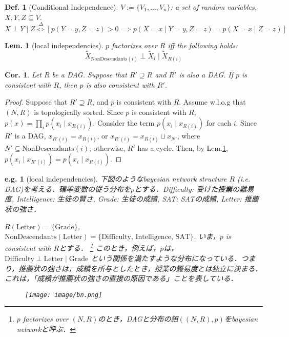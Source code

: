 \documentclass[11pt,a4paper,dvipdfmx]{article}
\theoremstyle{plain}
\newtheorem{lem}{Lem.}[section]
\newtheorem{cor}{Cor.}[section]
\newtheorem{df}{Def.}[section]
\newtheorem{eg}{e.g.}[section]
\renewcommand{\tilde}{\widetilde}
\newcommand{\defi}{\stackrel{\Delta}{\Longleftrightarrow}}
\begin{document}
\begin{df}[Conditional Independence]
	$V := \{ V_1, \dots, V_n\}$: a set of random variables, $X, Y, Z \subseteq V$. \\
	\[
	X \perp Y \mid Z \defi [p(Y=y, Z=z) > 0 \implies p(X=x \mid Y=y, Z = z)
	= p(X=x \mid Z = z)]
	\]
\end{df}

\begin{lem}[local independencies] \label{local_indep}
	$p$ factorizes over $R$ iff the following holds:\\
	$$
	\tilde{X}_{\text{NonDescendants}(i)} \perp \tilde{X}_i \mid \tilde{X}_{R(i)}
	$$
\end{lem}

\begin{cor}
	Let $R$ be a DAG. Suppose that $R' \supseteq R$ and $R'$ is also a DAG. If $p$ is consistent with $R$, then $p$ is also consistent with $R'$.
\end{cor}
\begin{proof}
	Suppose that $R' \supseteq R$, and $p$ is consistent with $R$. 
	Assume w.l.o.g that $(N, R)$ is topologically sorted.
	Since $p$ is consistent with $R$,
	$
	p(x) = \prod_i p(x_i \mid x_{R(i)}).
	$
	Consider the term $p(x_i \mid x_{R(i)})$ for each $i$. Since $R'$ is a DAG, $x_{R'(i)} = x_{R(i)}$, or $x_{R'(i)} = x_{R(i)} \sqcup x_{N'}$, where $N' \subseteq \text{NonDescendants}(i)$; otherwise, $R'$ has a cycle. Then, by Lem.\ref{local_indep},
	$p(x_i \mid x_{R'(i)}) = p(x_i \mid x_{R(i)})$.
\end{proof}

\begin{eg}[local independencies]
下図のようなbayesian network structure $R$ (i.e. DAG)を考える．確率変数の従う分布を$p$とする．Difficulty: 受けた授業の難易度, Intelligence: 生徒の賢さ, Grade: 生徒の成績, SAT: SATの成績, Letter: 推薦状の強さ．

$R(\text{Letter}) = \{\text{Grade}\}$, $\text{NonDescendants}(\text{Letter}) = \{\text{Difficulty, Intelligence, SAT}\}$.
いま，$p$ is consistent with $R$とする．
\footnote{
$p$ factorizes over $(N, R)$のとき，DAGと分布の組$((N,R), p)$を\textit{bayesian network}と呼ぶ．
}
このとき，例えば，$p$は，
$\text{Difficulty} \perp \text{Letter} \mid \text{Grade}$
という関係を満たすような分布になっている．つまり，推薦状の強さは，成績を所与としたとき，授業の難易度とは独立に決まる．これは，「成績が推薦状の強さの直接の原因である」ことを表している．

\begin{figure}[H]
\centering
\texttt{[image: image/bn.png]}
\end{figure}
\end{eg}
\end{document}
